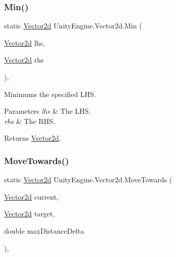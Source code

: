 \subsubsection{\texorpdfstring{Min()}{Min()}}
{\footnotesize\ttfamily static \hyperlink{struct_unity_engine_1_1_vector2d}{Vector2d} Unity\+Engine.\+Vector2d.\+Min (\begin{DoxyParamCaption}\item[{\hyperlink{struct_unity_engine_1_1_vector2d}{Vector2d}}]{lhs,  }\item[{\hyperlink{struct_unity_engine_1_1_vector2d}{Vector2d}}]{rhs }\end{DoxyParamCaption})\hspace{0.3cm}{\ttfamily [inline]}, {\ttfamily [static]}}



Minimums the specified L\+HS. 


\begin{DoxyParams}{Parameters}
{\em lhs} & The L\+HS.\\
\hline
{\em rhs} & The R\+HS.\\
\hline
\end{DoxyParams}
\begin{DoxyReturn}{Returns}
\hyperlink{struct_unity_engine_1_1_vector2d}{Vector2d}.
\end{DoxyReturn}
\mbox{\label{struct_unity_engine_1_1_vector2d_a6d10845548c9a0eacf2b3e9ca6a39cf1}} 
\subsubsection{\texorpdfstring{Move\+Towards()}{MoveTowards()}}
{\footnotesize\ttfamily static \hyperlink{struct_unity_engine_1_1_vector2d}{Vector2d} Unity\+Engine.\+Vector2d.\+Move\+Towards (\begin{DoxyParamCaption}\item[{\hyperlink{struct_unity_engine_1_1_vector2d}{Vector2d}}]{current,  }\item[{\hyperlink{struct_unity_engine_1_1_vector2d}{Vector2d}}]{target,  }\item[{double}]{max\+Distance\+Delta }\end{DoxyParamCaption})\hspace{0.3cm}{\ttfamily [inline]}, {\ttfamily [static]}}



